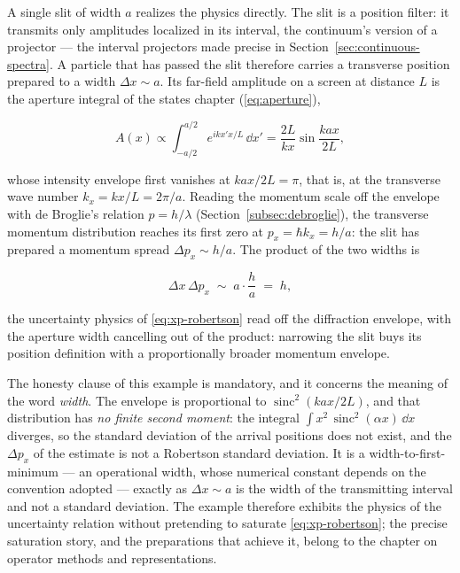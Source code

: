 A single slit of width $a$ realizes the physics directly. The slit is a position filter: it transmits only amplitudes localized in its interval, the continuum's version of a projector --- the interval projectors made precise in Section~\ref{sec:continuous-spectra}. A particle that has passed the slit therefore carries a transverse position prepared to a width $\Delta x \sim a$. Its far-field amplitude on a screen at distance $L$ is the aperture integral of the states chapter (\eqref{eq:aperture}),
\begin{linenomath}
    \begin{equation}
        A(x) \propto \int_{-a/2}^{a/2} e^{ikx'x/L}\,\dd x' = \frac{2L}{kx}\sin\frac{kax}{2L} ,
    \end{equation}
\end{linenomath}
whose intensity envelope first vanishes at $kax/2L = \pi$, that is, at the transverse wave number $k_x = kx/L = 2\pi/a$. Reading the momentum scale off the envelope with de Broglie's relation $p = h/\lambda$ (Section~\ref{subsec:debroglie}), the transverse momentum distribution reaches its first zero at $p_x = \hbar k_x = h/a$: the slit has prepared a momentum spread $\Delta p_x \sim h/a$. The product of the two widths is
\begin{linenomath}
    \begin{equation}
        \Delta x\,\Delta p_x \;\sim\; a\cdot\frac{h}{a} \;=\; h ,
    \end{equation}
\end{linenomath}
the uncertainty physics of \eqref{eq:xp-robertson} read off the diffraction envelope, with the aperture width cancelling out of the product: narrowing the slit buys its position definition with a proportionally broader momentum envelope.

The honesty clause of this example is mandatory, and it concerns the meaning of the word \emph{width}. The envelope is proportional to $\operatorname{sinc}^2(kax/2L)$, and that distribution has \emph{no finite second moment}: the integral $\int x^2\,\operatorname{sinc}^2(\alpha x)\,\dd x$ diverges, so the standard deviation of the arrival positions does not exist, and the $\Delta p_x$ of the estimate is not a Robertson standard deviation. It is a width-to-first-minimum --- an operational width, whose numerical constant depends on the convention adopted --- exactly as $\Delta x \sim a$ is the width of the transmitting interval and not a standard deviation. The example therefore exhibits the physics of the uncertainty relation without pretending to saturate \eqref{eq:xp-robertson}; the precise saturation story, and the preparations that achieve it, belong to the chapter on operator methods and representations.

